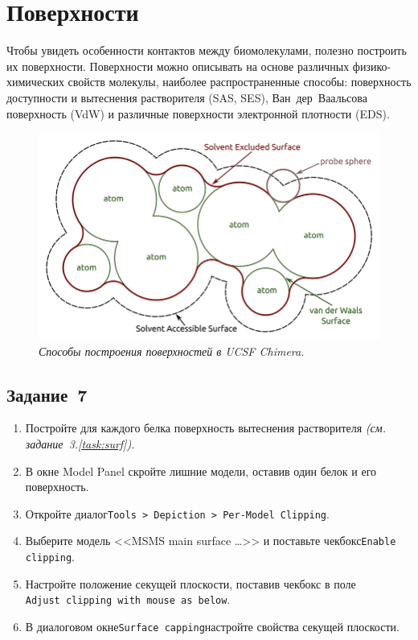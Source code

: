 \section{Поверхности}

Чтобы увидеть особенности контактов между биомолекулами, полезно построить их поверхности. Поверхности можно описывать на основе различных физико-химических свойств молекулы, наиболее распространенные способы: поверхность доступности и вытеснения растворителя (SAS, SES), Ван~дер~Ваальсова поверхность (VdW) и различные поверхности электронной плотности (EDS).
\begin{figure}[h!]
  \includegraphics[width=\linewidth]{Figures/Surface.png}
  \caption{\textit{Способы построения поверхностей в UCSF Chimera.}}
  \label{fig:surf}
\end{figure}\clearpage

\subsection*{Задание~7}
\begin{enumerate}
    \item Постройте для каждого белка поверхность вытеснения растворителя \textit{(см. задание~3.\ref{task:surf})}.
    
    \item В окне Model Panel скройте лишние модели, оставив один белок и его поверхность.
    
    \item Откройте диалог\quad\texttt{Tools~> De\-pic\-tion~> Per-Mo\-del Clip\-ping}.
    
    \item Выберите модель <<MSMS main surface \dots>> и поставьте чекбокс\quad\texttt{En\-able clip\-ping}.
    
    \item Настройте положение секущей плоскости, поставив чекбокс в поле\\
    \texttt{Adjust clipping with mouse as below}.
    
    \item В диалоговом окне\quad\texttt{Sur\-face cap\-ping}\quad настройте свойства секущей плоскости.
\end{enumerate}